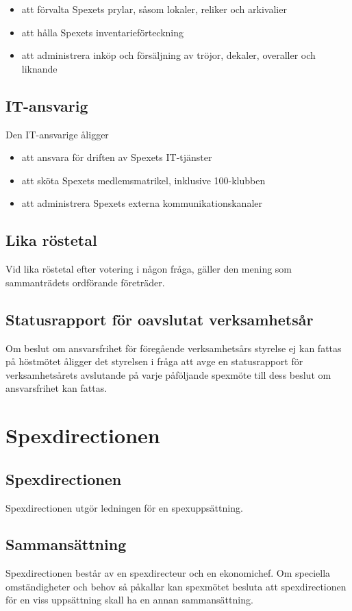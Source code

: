 \documentclass[a4paper]{article}
\begin{document}
\begin{itemize}
  \item att förvalta Spexets prylar, såsom lokaler, reliker och arkivalier
  \item att hålla Spexets inventarieförteckning
  \item att administrera inköp och försäljning av tröjor, dekaler, overaller och liknande
\end{itemize}

\subsection{IT-ansvarig}
Den IT-ansvarige åligger

\begin{itemize}
  \item att ansvara för driften av Spexets IT-tjänster
  \item att sköta Spexets medlemsmatrikel, inklusive 100-klubben
  \item att administrera Spexets externa kommunikationskanaler
\end{itemize}

\subsection{Lika röstetal}
Vid lika röstetal efter votering i någon fråga, gäller den mening som sammanträdets ordförande företräder.

\subsection{Statusrapport för oavslutat verksamhetsår}
Om beslut om ansvarsfrihet för föregående verksamhetsårs styrelse ej kan fattas på höstmötet åligger det styrelsen i fråga att avge en statusrapport för verksamhetsårets avslutande på varje påföljande spexmöte till dess beslut om ansvarsfrihet kan fattas.

\section{Spexdirectionen}
\label{section:spexdirectionen}

\subsection{Spexdirectionen}
Spexdirectionen utgör ledningen för en spexuppsättning.

\subsection{Sammansättning}
Spexdirectionen består av en spexdirecteur och en ekonomichef.\newline
\newline
Om speciella omständigheter och behov så påkallar kan spexmötet besluta att spexdirectionen för en viss uppsättning skall ha en annan sammansättning.
\end{document}
